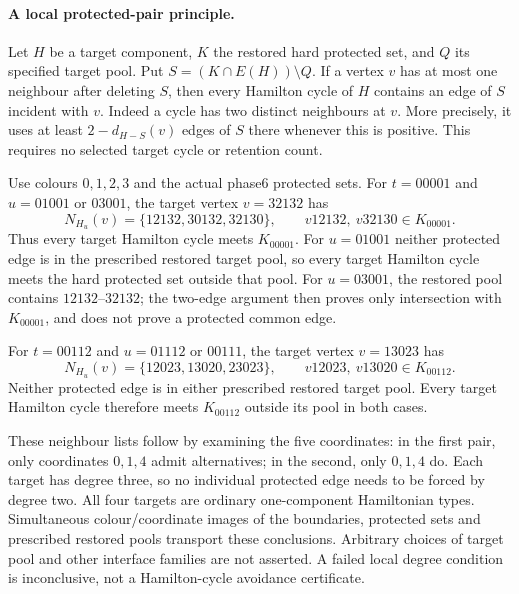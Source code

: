 \paragraph{A local protected-pair principle.}
Let $H$ be a target component, $K$ the restored hard protected set,
and $Q$ its specified target pool. Put $S=(K\cap E(H))\setminus Q$.
If a vertex $v$ has at most one neighbour after deleting $S$, then
every Hamilton cycle of $H$ contains an edge of $S$ incident with $v$.
Indeed a cycle has two distinct neighbours at $v$. More precisely,
it uses at least $2-d_{H-S}(v)$ edges of $S$ there whenever this is
positive. This requires no selected target cycle or retention count.

Use colours $0,1,2,3$ and the actual phase6 protected sets. For
$t=00001$ and $u=01001$ or $03001$, the target vertex $v=32132$ has
\[
N_{H_u}(v)=\{12132,30132,32130\},\qquad
v12132,\ v32130\in K_{00001}.
\]
Thus every target Hamilton cycle meets $K_{00001}$.
For $u=01001$ neither protected edge is in the prescribed restored
target pool, so every target Hamilton cycle meets the hard protected
set outside that pool. For $u=03001$, the restored pool contains
$12132$--$32132$; the two-edge argument then proves only intersection
with $K_{00001}$, and does not prove a protected common edge.

For $t=00112$ and $u=01112$ or $00111$, the target vertex $v=13023$
has
\[
N_{H_u}(v)=\{12023,13020,23023\},\qquad
v12023,\ v13020\in K_{00112}.
\]
Neither protected edge is in either prescribed restored target pool.
Every target Hamilton cycle therefore meets $K_{00112}$ outside
its pool in both cases.

These neighbour lists follow by examining the five coordinates:
in the first pair, only coordinates $0,1,4$ admit alternatives;
in the second, only $0,1,4$ do. Each target has degree three, so
no individual protected edge needs to be forced by degree two.
All four targets are ordinary one-component Hamiltonian types.
Simultaneous colour/coordinate images of the boundaries, protected
sets and prescribed restored pools transport these conclusions.
Arbitrary choices of target pool and other interface families are
not asserted. A failed local degree condition is inconclusive,
not a Hamilton-cycle avoidance certificate.
